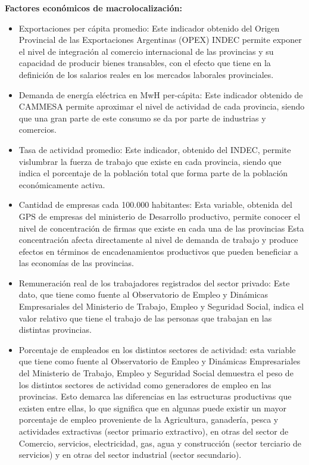 \documentclass[12pt,a4paper]{article}
\begin{document}
\textbf{Factores económicos de macrolocalización:}
\begin{itemize}
\item Exportaciones per cápita promedio: Este indicador obtenido del Origen Provincial de las Exportaciones Argentinas (OPEX) INDEC permite exponer el nivel de integración al comercio internacional de las provincias y su capacidad de producir bienes transables, con el efecto que tiene en la definición de los salarios reales en los mercados laborales provinciales.

\item Demanda de energía eléctrica en MwH per-cápita: Este indicador obtenido de CAMMESA permite aproximar el nivel de actividad de cada provincia, siendo que una gran parte de este consumo se da por parte de industrias y comercios.

\item Tasa de actividad promedio: Este indicador, obtenido del INDEC, permite vislumbrar la fuerza de trabajo que existe en cada provincia, siendo que indica el porcentaje de la población total que forma parte de la población económicamente activa.

\item Cantidad de empresas cada 100.000 habitantes: Esta variable, obtenida del GPS de empresas del ministerio de Desarrollo productivo, permite conocer el nivel de concentración de firmas que existe en cada una de las provincias Esta concentración afecta directamente al nivel de demanda de trabajo y produce efectos en términos de encadenamientos productivos que pueden beneficiar a las economías de las provincias.

\item Remuneración real de los trabajadores registrados del sector privado: Este dato, que tiene como fuente al Observatorio de Empleo y Dinámicas Empresariales del Ministerio de Trabajo, Empleo y Seguridad Social, indica el valor relativo que tiene el trabajo de las personas que trabajan en las distintas provincias.

\item Porcentaje de empleados en los distintos sectores de actividad: esta variable que tiene como fuente al Observatorio de Empleo y Dinámicas Empresariales del Ministerio de Trabajo, Empleo y Seguridad Social demuestra el peso de los distintos sectores de actividad como generadores de empleo en las provincias. Esto demarca las diferencias en las estructuras productivas que existen entre ellas, lo que significa que en algunas puede existir un mayor porcentaje de empleo proveniente de la Agricultura, ganadería, pesca y actividades extractivas (sector primario extractivo), en otras del sector de Comercio, servicios, electricidad, gas, agua y construcción (sector terciario de servicios) y en otras del sector industrial (sector secundario).


\end{itemize}
\end{document}
